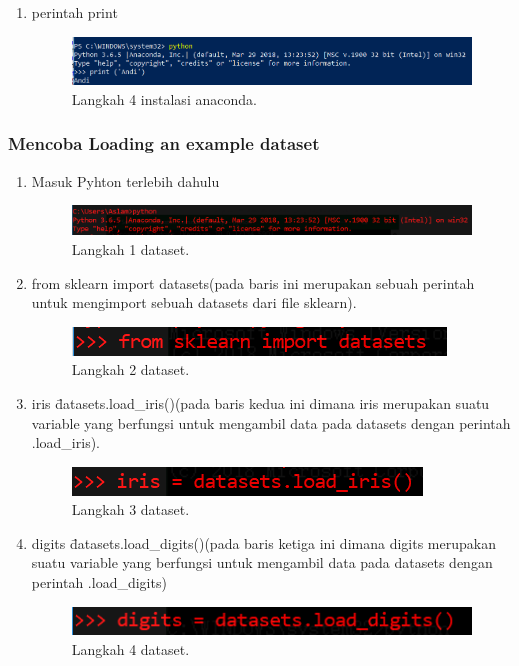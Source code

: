 \begin{enumerate}
\item perintah print
\begin{figure} [ht]
\centering 
\includegraphics[scale=1] {figures/5.png}
\caption{Langkah 4 instalasi anaconda. }
\end{figure}
\end{enumerate}

\subsubsection{Mencoba Loading an example dataset}
\begin{enumerate}
\item Masuk Pyhton terlebih dahulu
\begin{figure} [ht]
\centering 
\includegraphics[scale=1] {figures/6.png}
\caption{Langkah 1 dataset. }
\end{figure}

\item from sklearn import datasets(pada baris ini merupakan sebuah perintah untuk mengimport sebuah datasets dari file sklearn).
\begin{figure} [ht]
\centering 
\includegraphics[scale=1] {figures/7.png}
\caption{Langkah 2 dataset. }
\end{figure}

\item iris \= datasets.load\_iris()(pada baris kedua ini dimana iris merupakan suatu variable yang berfungsi untuk mengambil data pada datasets dengan perintah .load\_iris).
\begin{figure} [ht]
\centering 
\includegraphics[scale=1] {figures/8.png}
\caption{Langkah 3 dataset. }
\end{figure}

\item digits \= datasets.load\_digits()(pada baris ketiga ini dimana digits merupakan suatu variable yang berfungsi untuk mengambil data pada datasets dengan perintah .load\_digits)
\begin{figure} [ht]
\centering 
\includegraphics[scale=1] {figures/9.png}
\caption{Langkah 4 dataset. }
\end{figure}


\end{enumerate}
